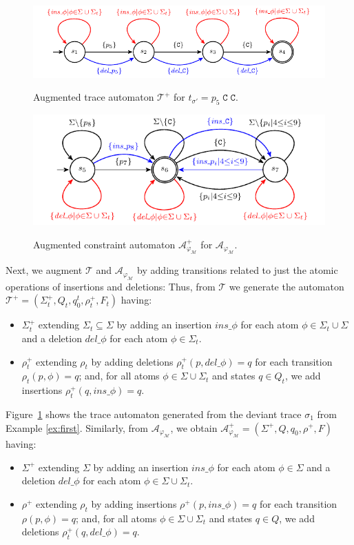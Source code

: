 \begin{figure}[!t]
	\centering
	{\includegraphics[width=.7\textwidth]{images/Tplus}}
	\caption{Augmented trace automaton $\mathcal{T}^+$ for $t_{\sigma'}=p_5\;\texttt{C}\;\texttt{C}$.}\label{fig:tplus}
\end{figure} \begin{figure}[!t]
\centering
{\includegraphics[width=.7\textwidth]{images/Aplus}}
\caption{Augmented constraint automaton $\mathcal{A}_{\varphi_{\mathcal{M}}}^+$ for $\mathcal{A}_{\varphi_{\mathcal{M}}}$.}\label{fig:aplus}
\end{figure}
Next, we augment $\mathcal{T}$ and $\mathcal{A}_{\varphi_{\mathcal{M}}}$ by adding transitions related to just the atomic operations of insertions and deletions: Thus, from $\mathcal{T}$ we generate the automaton $\mathcal{T}^+=(\Sigma_t^+,Q_t,q_0^t,\rho_t^+,F_t)$ having:
\begin{itemize}
	\item $\Sigma_t^+$ extending $\Sigma_t\subseteq \Sigma$ by adding an insertion $\textit{ins\_}\phi$ for each atom $\phi\in\Sigma_t\cup\Sigma$ and a deletion $\textit{del\_}\phi$ for each atom  $\phi\in\Sigma_t$.
	\item $\rho_t^+$ extending $\rho_t$ by adding deletions $\rho_t^+(p,\textit{del\_}\phi)=q$ for each transition $\rho_t(p,\phi)=q$; and, for all atoms $\phi\in\Sigma\cup\Sigma_t$ and states $q\in Q_t$, we add insertions $\rho_t^+(q,\textit{ins\_}\phi)=q$.
\end{itemize}
Figure~\ref{fig:tplus} shows the trace automaton generated from the deviant trace $\sigma_1$ from Example \ref{ex:first}. Similarly, from $\mathcal{A}_{\varphi_{\mathcal{M}}}$, we obtain $\mathcal{A}_{\varphi_{\mathcal{M}}}^+=(\Sigma^+,Q,q_0,\rho^+,F)$ having:
\begin{itemize}
	\item $\Sigma^+$ extending $\Sigma$ by adding an insertion $\textit{ins\_}\phi$ for each atom $\phi\in\Sigma$ and a deletion $\textit{del\_}\phi$ for each atom  $\phi\in\Sigma\cup\Sigma_t$.
\item $\rho^+$ extending $\rho_t$ by adding insertions $\rho^+(p,\textit{ins\_}\phi)=q$ for each transition $\rho(p,\phi)=q$; and, for all atoms $\phi\in\Sigma\cup\Sigma_t$ and states $q\in Q$, we add deletions $\rho_t^+(q,\textit{del\_}\phi)=q$.
\end{itemize}
